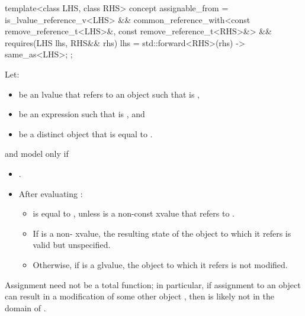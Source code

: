 %
\begin{itemdecl}
template<class LHS, class RHS>
  concept assignable_from =
    is_lvalue_reference_v<LHS> &&
    common_reference_with<const remove_reference_t<LHS>&, const remove_reference_t<RHS>&> &&
    requires(LHS lhs, RHS&& rhs) {
      { lhs = std::forward<RHS>(rhs) } -> same_as<LHS>;
    };
\end{itemdecl}

\begin{itemdescr}
\pnum
Let:
\begin{itemize}
\item {} be an lvalue that refers to an object  such that
   is ,
\item {} be an expression such that  is
  , and
\item {} be a distinct object that is equal to .
\end{itemize}
 and  model
 only if

\begin{itemize}
\item {}.

\item After evaluating :

\begin{itemize}
\item {} is equal to , unless  is a non-const
xvalue that refers to .

\item If  is a non- xvalue, the resulting state of the
object to which it refers is valid but unspecified.

\item Otherwise, if  is a glvalue, the object to which it refers is
  not modified.
\end{itemize}
\end{itemize}

\pnum
\begin{note}
Assignment need not be a total function;
in particular, if assignment to an object  can result in a modification
of some other object , then  is likely not in the domain
of \tcode{=}.
\end{note}
\end{itemdescr}

